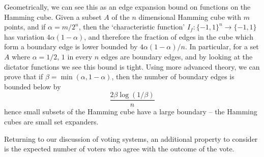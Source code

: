 Geometrically, we can see this as an edge expansion bound on functions on the Hamming cube. Given a subset $A$ of the $n$ dimensional Hamming cube with $m$ points, and if $\alpha = m/2^n$, then the `characteristic function' $I_f: \{ -1, 1 \}^n \to \{ -1, 1 \}$ has variation $4 \alpha (1 - \alpha)$, and therefore the fraction of edges in the cube which form a boundary edge is lower bounded by $4\alpha(1-\alpha)/n$. In particular, for a set $A$ where $\alpha = 1/2$, $1$ in every $n$ edges are boundary edges, and by looking at the dictator functions we see this bound is tight. Using more advanced theory, we can prove that if $\beta = \min(\alpha, 1-\alpha)$, then the number of boundary edges is bounded below by
%
\[ \frac{2 \beta \log(1/\beta)}{n} \]
%
hence small subsets of the Hamming cube have a large boundary -- the Hamming cubes are small set expanders.

Returning to our discussion of voting systems, an additional property to consider is the expected number of voters who agree with the outcome of the vote.

